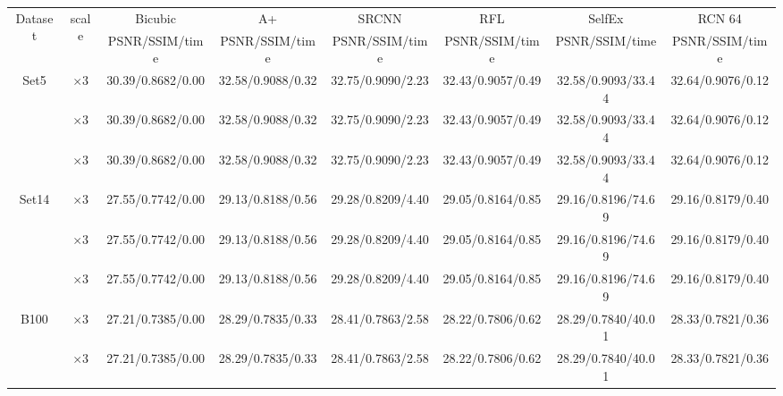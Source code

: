 \documentclass[10pt,twocolumn,letterpaper]{article}
\begin{document}
\footnotetext{\textcolor{red}{PSNRs are slightly different from the original paper as they use different evaluation framework }}

\begin{table}
\begin{center}
\setlength{\tabcolsep}{2pt}
\footnotesize
\begin{tabular}{ | c | c | c | c | c | c | c | c | }
\hline
\multirow{2}{*}{Dataset} & \multirow{2}{*}{scale} & Bicubic & A+ & SRCNN & RFL & SelfEx & RCN 64\\
 & & PSNR/SSIM/time & PSNR/SSIM/time & PSNR/SSIM/time & PSNR/SSIM/time & PSNR/SSIM/time & PSNR/SSIM/time\\
\hline
\hline
\multirow{3}{*}{Set5} & $\times$3 & 30.39/0.8682/0.00 & 32.58/0.9088/0.32 & {\color{red}32.75}/{\color{blue}0.9090}/2.23 & 32.43/0.9057/0.49 & 32.58/{\color{red}0.9093}/33.44 & {\color{blue}32.64}/0.9076/0.12\\
 & $\times$3 & 30.39/0.8682/0.00 & 32.58/0.9088/0.32 & {\color{red}32.75}/{\color{blue}0.9090}/2.23 & 32.43/0.9057/0.49 & 32.58/{\color{red}0.9093}/33.44 & {\color{blue}32.64}/0.9076/0.12\\
 & $\times$3 & 30.39/0.8682/0.00 & 32.58/0.9088/0.32 & {\color{red}32.75}/{\color{blue}0.9090}/2.23 & 32.43/0.9057/0.49 & 32.58/{\color{red}0.9093}/33.44 & {\color{blue}32.64}/0.9076/0.12\\
\hline
\hline
\multirow{3}{*}{Set14} & $\times$3 & 27.55/0.7742/0.00 & 29.13/0.8188/0.56 & {\color{red}29.28}/{\color{red}0.8209}/4.40 & 29.05/0.8164/0.85 & 29.16/{\color{blue}0.8196}/74.69 & {\color{blue}29.16}/0.8179/0.40\\
 & $\times$3 & 27.55/0.7742/0.00 & 29.13/0.8188/0.56 & {\color{red}29.28}/{\color{red}0.8209}/4.40 & 29.05/0.8164/0.85 & 29.16/{\color{blue}0.8196}/74.69 & {\color{blue}29.16}/0.8179/0.40\\
 & $\times$3 & 27.55/0.7742/0.00 & 29.13/0.8188/0.56 & {\color{red}29.28}/{\color{red}0.8209}/4.40 & 29.05/0.8164/0.85 & 29.16/{\color{blue}0.8196}/74.69 & {\color{blue}29.16}/0.8179/0.40\\
\hline
\hline
\multirow{3}{*}{B100} & $\times$3 & 27.21/0.7385/0.00 & 28.29/0.7835/0.33 & {\color{red}28.41}/{\color{red}0.7863}/2.58 & 28.22/0.7806/0.62 & 28.29/{\color{blue}0.7840}/40.01 & {\color{blue}28.33}/0.7821/0.36\\
 & $\times$3 & 27.21/0.7385/0.00 & 28.29/0.7835/0.33 & {\color{red}28.41}/{\color{red}0.7863}/2.58 & 28.22/0.7806/0.62 & 28.29/{\color{blue}0.7840}/40.01 & {\color{blue}28.33}/0.7821/0.36\\

\end{tabular}
\end{center}
\end{table}
\end{document}
